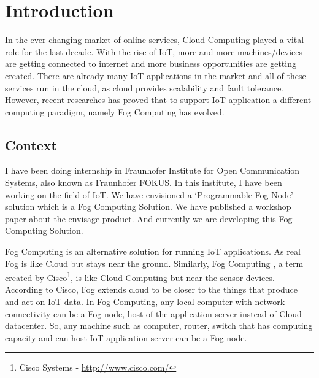 \section{Introduction}



In the ever-changing market of online services, Cloud Computing played a vital role for the last decade. With the rise of \ac{IoT}, more and more machines/devices are getting connected to internet and more business opportunities are getting created. There are already many \ac{IoT} applications in the market and all of these services run in the cloud, as cloud provides scalability and fault tolerance. However, recent researches \citep{Fog, ciscowhite} has proved that to support \ac{IoT} application a different computing paradigm, namely Fog Computing has evolved. %

\subsection{Context}
I have been doing internship in Fraunhofer Institute for Open Communication Systems, also known as Fraunhofer FOKUS. In this institute, I have been working on the field of \ac{IoT}. We have envisioned a `Programmable Fog Node' solution which is a Fog Computing Solution. We have published a workshop paper\citep{ProgFogNode} about the envisage product. And currently we are developing this Fog Computing Solution.

Fog Computing is an alternative solution for running \ac{IoT} applications. As real Fog is like Cloud but stays near the ground. Similarly, Fog Computing \citep{Fog}, a term created by Cisco\footnote{Cisco Systems - \url{http://www.cisco.com/}}, is like Cloud Computing but near the sensor devices. According to Cisco, Fog extends cloud to be closer to the things that produce and act on IoT data\citep{ciscowhite}. In Fog Computing, any local computer with network connectivity can be a Fog node, host of the application server instead of Cloud datacenter. So, any  machine such as computer, router, switch that has computing capacity and can host \ac{IoT} application server can be a Fog node.


